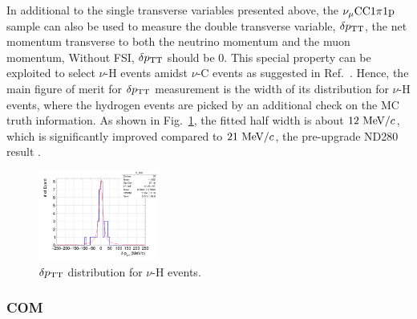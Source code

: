      In additional to the single transverse variables presented above, the $\nu_{\mu}\textrm{CC}1\pi1\textrm{p}$ sample can also be used to measure the double transverse variable, $\delta p_\textrm{TT}$, the net momentum transverse to both the neutrino momentum and the muon momentum,
     Without FSI, $\delta p_\textrm{TT}$ should be $0$. This special property can be exploited to select $\nu$-H events amidst $\nu$-C events as suggested in Ref.~\cite{dpttpaper}. 
     Hence, the main figure of merit for $\delta p_\textrm{TT}$ measurement is the width of its distribution for $\nu$-H events, where the hydrogen events are picked by an additional check on the MC truth information.
     As shown in Fig.~\ref{fig:dptt-hist}, the fitted half width is about $12~\textrm{MeV}/c$, which is significantly improved compared to $21~\textrm{MeV}/c$, the pre-upgrade ND280 result \cite{dpttpaper}.

     \begin{figure}[!htb] 
          \centering 		
          \includegraphics[width=0.35\textwidth]{figures/SFGpTPCmu_dptt_hist_al15_H_bin100_range500_Lfit.png}
          \caption{\label{fig:dptt-hist} $\delta p_\textrm{TT}$ distribution for $\nu$-H events.} 
     \end{figure}

     \subsubsection{COM}


